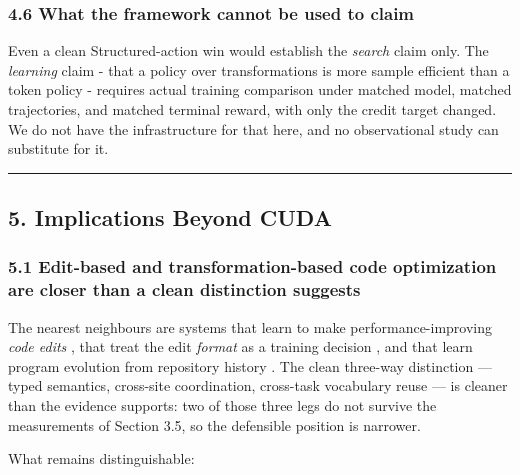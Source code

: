 \documentclass[
  11pt,
]{article}
\begin{document}
\hypertarget{what-the-framework-cannot-be-used-to-claim}{%
\subsubsection{4.6 What the framework cannot be used to claim}\label{what-the-framework-cannot-be-used-to-claim}}

Even a clean Structured-action win would establish the \emph{search} claim only. The \emph{learning} claim - that a policy over transformations is more sample efficient than a token policy - requires actual training comparison under matched model, matched trajectories, and matched terminal reward, with only the credit target changed. We do not have the infrastructure for that here, and no observational study can substitute for it.

\begin{center}\rule{0.5\linewidth}{0.5pt}\end{center}

\hypertarget{implications-beyond-cuda}{%
\subsection{5. Implications Beyond CUDA}\label{implications-beyond-cuda}}

\hypertarget{edit-based-and-transformation-based-code-optimization-are-closer-than-a-clean-distinction-suggests}{%
\subsubsection{5.1 Edit-based and transformation-based code optimization are closer than a clean distinction suggests}\label{edit-based-and-transformation-based-code-optimization-are-closer-than-a-clean-distinction-suggests}}

The nearest neighbours are systems that learn to make performance-improving \emph{code edits} \cite{learning4,neural5,llm31}, that treat the edit \emph{format} as a training decision \cite{to6}, and that learn program evolution from repository history \cite{swerl7}. The clean three-way distinction --- typed semantics, cross-site coordination, cross-task vocabulary reuse --- is cleaner than the evidence supports: two of those three legs do not survive the measurements of Section 3.5, so the defensible position is narrower.

What remains distinguishable:
\end{document}
